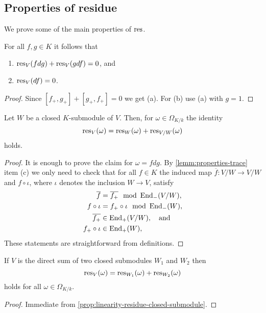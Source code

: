 \subsection{Properties of residue}
We prove some of the main properties of $\operatorname{res}$.
\begin{proposition}\label{prop:linearity-residue}
	For all $f,g \in K$ it follows that
	\begin{enumerate}[label = (\alph*)]
		\item $\operatorname{res}_{V}(fdg) + \operatorname{res}_{V}(gdf) = 0$, and
		\item $\operatorname{res}_V(df) = 0$.
	\end{enumerate}
\end{proposition}
\begin{proof}
	Since $[f_{+}, g_{+}] + [g_{+}, f_{+}] = 0$ we get (a). For (b) use (a) with $g = 1$. 
\end{proof}
\begin{proposition}\label{prop:linearity-residue-closed-submodule}
	Let $W$ be a closed $K$-submodule of $V$. Then, for $\omega \in \Omega_{K/k}$ the identity
	\[
		\operatorname{res}_{V}(\omega) = \operatorname{res}_{W}(\omega) + \operatorname{res}_{V/W}(\omega)
	\]
	holds.
\end{proposition}
\begin{proof}
	It is enough to prove the claim for $\omega = f dg$. By \cref{lemm:properties-trace} item (c) we only need to check that for all $f \in K$ the induced map $\overline{f}\colon V/W \to V/W$ and $f \circ \iota$, where $\iota$ denotes the inclusion $W \to V$, satisfy
	\begin{align*}
	\overline{f} &= \overline{f_{+}} \mod {\operatorname{End}}_{-}(V/W), \\
	f \circ \iota &= f_{+} \circ \iota \mod {\operatorname{End}}_{-}(W), \\ 
	\overline{f_{+}}&\in \operatorname{End}_{+}(V/W), \quad\text{and} \\
	f_{+} \circ \iota &\in \operatorname{End}_{+}(W),
	\end{align*}
	These statements are straightforward from definitions.
\end{proof}
\begin{proposition}\label{prop:direct-sum-residue}
	If $V$ is the direct sum of two closed submodules $W_{1}$ and $W_{2}$ then 
	\[
		\operatorname{res}_{V}(\omega) = \operatorname{res}_{W_{1}}(\omega) + \operatorname{res}_{W_{2}}(\omega)
	\]
	holds for all $\omega \in \Omega_{K/k}$.
\end{proposition}
\begin{proof}
	Immediate from \cref{prop:linearity-residue-closed-submodule}.
\end{proof}
